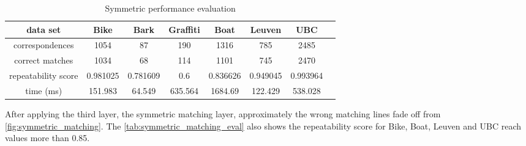 \begin{table}[H]
  \begin{tabular}{| c || c | c | c | c | c | c | c |}
      \hline
      data set & Bike & Bark & Graffiti & Boat & Leuven & UBC \\ \hline \hline
      correspondences & 1054 & 87 & 190 & 1316 & 785 & 2485 \\ \hline
      correct matches & 1034 & 68 & 114 & 1101 & 745 & 2470 \\ \hline
      repeatability score & 0.981025 & 0.781609 & 0.6 & 0.836626 & 0.949045 & 0.993964 \\ \hline
      time (ms) & 151.983 & 64.549 & 635.564 & 1684.69 & 122.429 & 538.028 \\ \hline
  \end{tabular}
  \caption{Symmetric performance evaluation} \label{tab:symmetric_matching_eval}
\end{table}

After applying the third layer, the symmetric matching layer, approximately the wrong matching lines fade off from \autoref{fig:symmetric_matching}. The \autoref{tab:symmetric_matching_eval} also shows the repeatability score for Bike, Boat, Leuven and UBC reach values more than 0.85.

